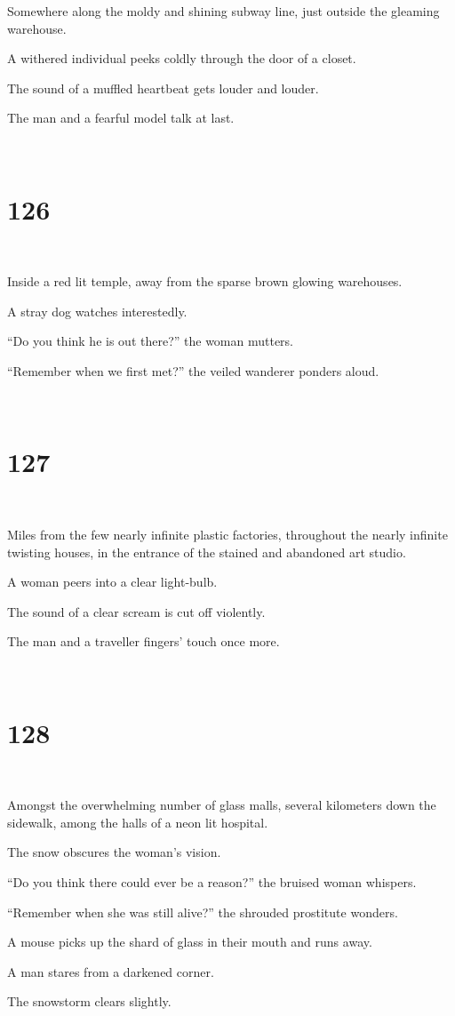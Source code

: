 \documentclass{report}
\begin{document}
Somewhere along the moldy and shining subway line, just outside the gleaming warehouse.

A withered individual peeks coldly through the door of a closet.

The sound of a muffled heartbeat gets louder and louder.

The man and a fearful model talk at last.

~
\chapter*{126}
~

Inside a red lit temple, away from the sparse brown glowing warehouses.

A stray dog watches interestedly.

``Do you think he is out there?'' the woman mutters.

``Remember when we first met?'' the veiled wanderer ponders aloud.

~
\chapter*{127}
~

Miles from the few nearly infinite plastic factories, throughout the nearly infinite twisting houses, in the entrance of the stained and abandoned art studio.

A woman peers into a clear light-bulb.

The sound of a clear scream is cut off violently.

The man and a traveller fingers' touch once more.

~
\chapter*{128}
~

Amongst the overwhelming number of glass malls, several kilometers down the sidewalk, among the halls of a neon lit hospital.

The snow obscures the woman's vision.

``Do you think there could ever be a reason?'' the bruised woman whispers.

``Remember when she was still alive?'' the shrouded prostitute wonders.

A mouse picks up the shard of glass in their mouth and runs away.

A man stares from a darkened corner.

The snowstorm clears slightly.
\end{document}
